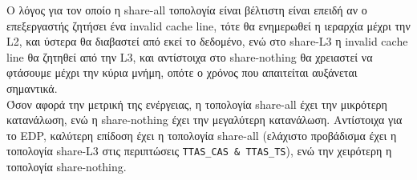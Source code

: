 \documentclass[12pt,a4paper]{article}
\begin{document}
				Ο λόγος για τον οποίο η share-all τοπολογία είναι βέλτιστη είναι επειδή αν ο επεξεργαστής ζητήσει ένα invalid cache line, τότε θα ενημερωθεί η ιεραρχία μέχρι την L2, και ύστερα θα διαβαστεί από εκεί το δεδομένο, ενώ στο share-L3 η invalid cache line θα ζητηθεί από την L3, και αντίστοιχα στο share-nothing θα χρειαστεί να φτάσουμε μέχρι την κύρια μνήμη, οπότε ο χρόνος που απαιτείται αυξάνεται σημαντικά. \\
				
				Όσον αφορά την μετρική της ενέργειας, η τοπολογία share-all έχει την μικρότερη κατανάλωση, ενώ η share-nothing έχει την μεγαλύτερη κατανάλωση. Αντίστοιχα για το EDP, καλύτερη επίδοση έχει η τοπολογία share-all (ελάχιστο προβάδισμα έχει η τοπολογία share-L3 στις περιπτώσεις \verb|TTAS_CAS & TTAS_TS|), ενώ την χειρότερη η τοπολογία share-nothing. 
\end{document}
